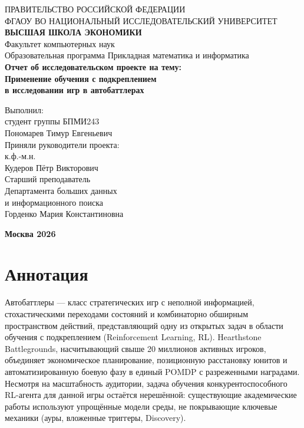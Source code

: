 \documentclass[a4paper,12pt]{extarticle}
\begin{document}
\begin{titlepage}
\thispagestyle{empty}
\begin{center}
ПРАВИТЕЛЬСТВО РОССИЙСКОЙ ФЕДЕРАЦИИ \\
ФГАОУ ВО НАЦИОНАЛЬНЫЙ ИССЛЕДОВАТЕЛЬСКИЙ УНИВЕРСИТЕТ \\
\textbf{\guillemotleft ВЫСШАЯ ШКОЛА ЭКОНОМИКИ\guillemotright} \\[0.5cm]
Факультет компьютерных наук \\
Образовательная программа \guillemotleft Прикладная математика и информатика\guillemotright \\[2.5cm]
\textbf{\Large Отчет об исследовательском проекте на тему:} \\[0.5cm]
\textbf{\large Применение обучения с подкреплением\\в исследовании игр в автобаттлерах} \\[3cm]
\end{center}
\vfill
\begin{flushright}
Выполнил: \\
студент группы БПМИ243 \\
Пономарев Тимур Евгеньевич \\[1cm]
Приняли руководители проекта: \\[0.3cm]
к.ф.-м.н. \\
Кудеров Пётр Викторович \\[0.7cm]
Старший преподаватель \\
Департамента больших данных \\
и информационного поиска \\
Горденко Мария Константиновна \\
\end{flushright}
\vfill
\begin{center}\textbf{Москва 2026}\end{center}
\end{titlepage}

\newpage
\tableofcontents
\newpage

\section*{Аннотация}

Автобаттлеры --- класс стратегических игр с неполной информацией, стохастическими переходами состояний и комбинаторно обширным пространством действий, представляющий одну из открытых задач в области обучения с подкреплением (Reinforcement Learning, RL). Hearthstone Battlegrounds, насчитывающий свыше 20 миллионов активных игроков, объединяет экономическое планирование, позиционную расстановку юнитов и автоматизированную боевую фазу в единый POMDP с разреженными наградами. Несмотря на масштабность аудитории, задача обучения конкурентоспособного RL-агента для данной игры остаётся нерешённой: существующие академические работы используют упрощённые модели среды, не покрывающие ключевые механики (ауры, вложенные триггеры, Discovery).
\end{document}
